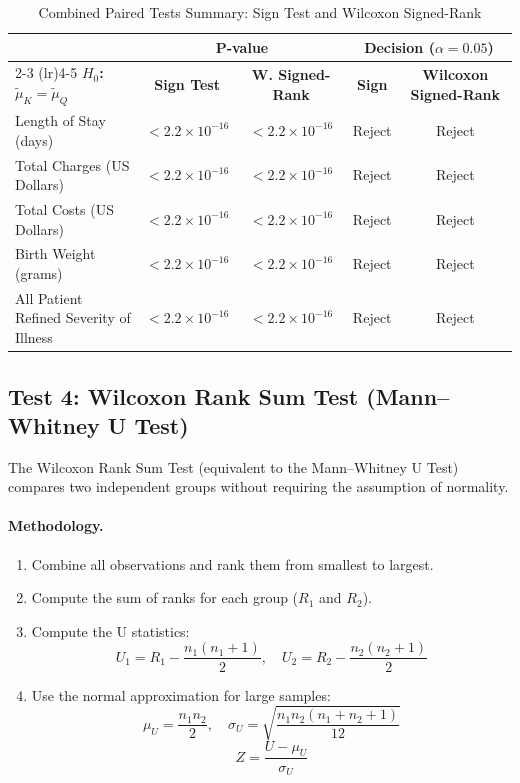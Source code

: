 \documentclass[12pt]{article}
\begin{document}
\begin{table}[H]
\centering
\caption{Combined Paired Tests Summary: Sign Test and Wilcoxon Signed-Rank}
\label{tab:paired-summary}
\small
\begin{tabular}{p{} c c c c}
\toprule
 & \multicolumn{2}{c}{\textbf{P-value}} & \multicolumn{2}{c}{\textbf{Decision ($\alpha = 0.05$)}} \\
\cmidrule(lr){2-3} \cmidrule(lr){4-5}
\textbf{$H_0$: $\tilde{\mu}_K = \tilde{\mu}_Q$} & \textbf{Sign Test} & \textbf{W. Signed-Rank} & \textbf{Sign} & \textbf{Wilcoxon Signed-Rank} \\
\midrule
Length of Stay (days)        & $< 2.2\times 10^{-16}$ & $< 2.2\times 10^{-16}$ & Reject & Reject \\
Total Charges (US Dollars)          & $< 2.2\times 10^{-16}$ & $< 2.2\times 10^{-16}$ & Reject & Reject \\
Total Costs (US Dollars)            & $< 2.2\times 10^{-16}$ & $< 2.2\times 10^{-16}$ & Reject & Reject \\
Birth Weight (grams)         & $< 2.2\times 10^{-16}$ & $< 2.2\times 10^{-16}$ & Reject & Reject \\
All Patient Refined Severity of Illness      & $< 2.2\times 10^{-16}$ & $< 2.2\times 10^{-16}$ & Reject & Reject \\
\bottomrule
\end{tabular}
\end{table}

\subsection{Test 4: Wilcoxon Rank Sum Test (Mann--Whitney U Test)}

The Wilcoxon Rank Sum Test (equivalent to the Mann--Whitney U Test)
compares two independent groups without requiring the assumption of
normality.

\paragraph{Methodology.}
\begin{enumerate}[nosep]
    \item Combine all observations and rank them from smallest to largest.
    \item Compute the sum of ranks for each group ($R_1$ and $R_2$).
    \item Compute the U statistics:
    \[
    U_1 = R_1 - \frac{n_1(n_1+1)}{2}, \quad U_2 = R_2 - \frac{n_2(n_2+1)}{2}
    \]
    \item Use the normal approximation for large samples:
    \[
    \mu_U = \frac{n_1 n_2}{2}, \quad \sigma_U = \sqrt{\frac{n_1 n_2 (n_1+n_2+1)}{12}}
    \]
    \[
    Z = \frac{U - \mu_U}{\sigma_U}
    \]
\end{enumerate}
\end{document}
